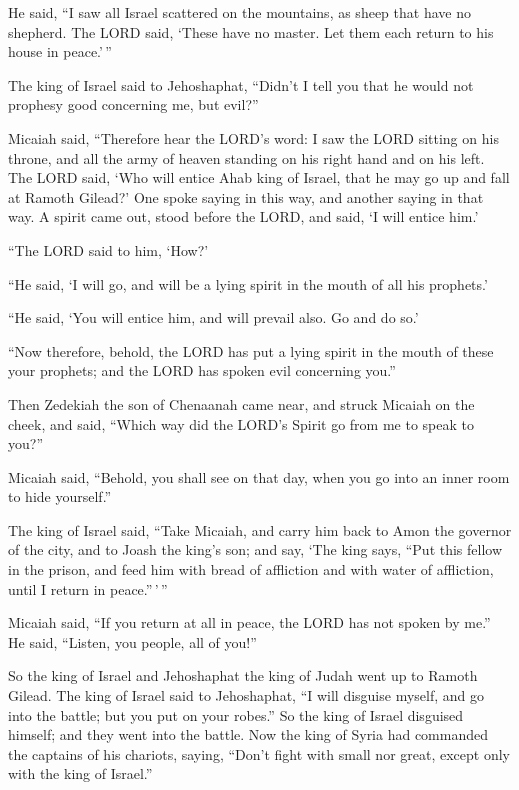  He said, ``I saw all Israel scattered on the mountains,
as sheep that have no shepherd. The LORD said, `These have no master.
Let them each return to his house in peace.'\,''

 The king of Israel said to Jehoshaphat, ``Didn't I tell
you that he would not prophesy good concerning me, but evil?''

 Micaiah said, ``Therefore hear the LORD's word: I saw
the LORD sitting on his throne, and all the army of heaven standing on
his right hand and on his left.  The LORD said, `Who will
entice Ahab king of Israel, that he may go up and fall at Ramoth
Gilead?' One spoke saying in this way, and another saying in that way.
 A spirit came out, stood before the LORD, and said, `I
will entice him.'

``The LORD said to him, `How?'

 ``He said, `I will go, and will be a lying spirit in the
mouth of all his prophets.'

``He said, `You will entice him, and will prevail also. Go and do so.'

 ``Now therefore, behold, the LORD has put a lying spirit
in the mouth of these your prophets; and the LORD has spoken evil
concerning you.''

 Then Zedekiah the son of Chenaanah came near, and struck
Micaiah on the cheek, and said, ``Which way did the LORD's Spirit go
from me to speak to you?''

 Micaiah said, ``Behold, you shall see on that day, when
you go into an inner room to hide yourself.''

 The king of Israel said, ``Take Micaiah, and carry him
back to Amon the governor of the city, and to Joash the king's son;
 and say, `The king says, ``Put this fellow in the
prison, and feed him with bread of affliction and with water of
affliction, until I return in peace.''\,'\,''

 Micaiah said, ``If you return at all in peace, the LORD
has not spoken by me.'' He said, ``Listen, you people, all of you!''

 So the king of Israel and Jehoshaphat the king of Judah
went up to Ramoth Gilead.  The king of Israel said to
Jehoshaphat, ``I will disguise myself, and go into the battle; but you
put on your robes.'' So the king of Israel disguised himself; and they
went into the battle.  Now the king of Syria had
commanded the captains of his chariots, saying, ``Don't fight with small
nor great, except only with the king of Israel.''

